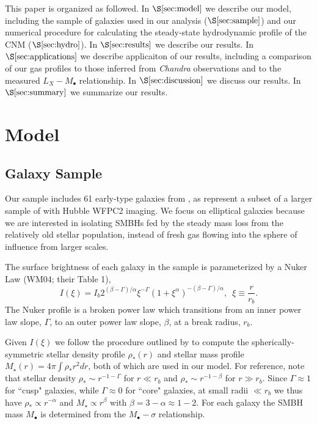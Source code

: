 \documentclass[usenatbib,fleqn]{mn2e}
\newcommand{\rb}{r_b}
\newcommand{\rhostar}{\rho_*}
\newcommand{\Mbh}[1][]{M_{\bullet#1}}
\begin{document}
This paper is organized as followed.  In $\S\ref{sec:model}$ we
describe our model, including the sample of galaxies used in our
analysis ($\S\ref{sec:sample}$) and our numerical procedure for
calculating the steady-state hydrodynamic profile of the CNM
($\S\ref{sec:hydro}$).  In $\S\ref{sec:results}$ we describe our
results.  In $\S\ref{sec:applications}$ we describe applicaiton of our
results, including a comparison of our gas profiles to those inferred
from {\it Chandra} observations and to the measured $L_X-\Mbh$
relationship.  In $\S\ref{sec:discussion}$ we discuss our results.  In
$\S\ref{sec:summary}$ we summarize our results.
\section{Model}
\label{sec:model}

\subsection{Galaxy Sample}

\label{sec:sample}

Our sample includes 61 early-type galaxies from , as represent a subset of a larger sample of \citet{FaberTremaine+:1997a} with Hubble WFPC2 imaging.  We focus on elliptical galaxies because we are interested in isolating SMBHs fed by the steady mass loss from the relatively old stellar population, instead of fresh gas flowing into the sphere of influence from larger scales.

The surface brightness of each galaxy in the sample is parameterized by a Nuker Law (WM04; their Table 1),
\begin{equation}
  I(\xi)=I_b 2^{(\beta-\Gamma)/\alpha} \xi^{-\Gamma} (1+\xi^\alpha)^{-(\beta-\Gamma)/\alpha}, \,\,\,\xi\equiv\frac{r}{r_b}.
\end{equation}
The Nuker profile is a broken power law which transitions from an inner power law slope, $\Gamma$, to an outer power law slope, $\beta$, at a break radius, $\rb$.  

Given $I(\xi)$ we follow the procedure outlined by
 to compute the spherically-symmetric
stellar density profile $\rhostar(r)$ and stellar mass profile
$M_{\star}(r) = 4\pi \int \rhostar r^{2}dr$, both of which are used in
our model.  For reference, note that stellar density $\rhostar\sim
r^{-1-\Gamma}$ for $r \ll \rb$ and $\rhostar\sim r^{-1-\beta}$ for $r
\gg \rb$.  Since $\Gamma\approx 1$ for ``cusp" galaxies, while
$\Gamma\approx 0$ for ``core" galaxies, at small radii $\ll \rb$ we
thus have $\rhostar \propto r^{-\alpha}$ and $M_{\star} \propto
r^{\beta}$ with $\beta = 3-\alpha \approx 1-2$.  For each galaxy the
SMBH mass $\Mbh$ is determined from the $\Mbh-\sigma$ relationship.
\end{document}
